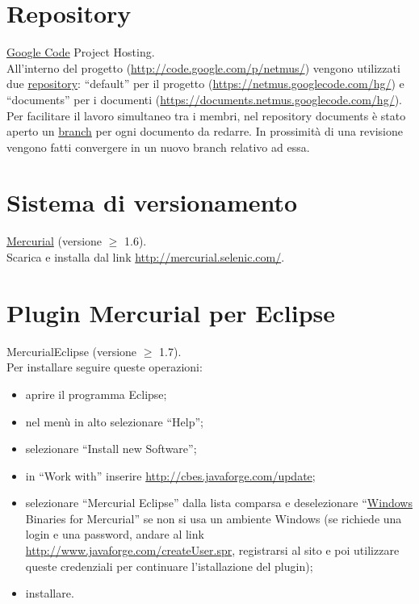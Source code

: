 \section{Repository}
\underline{Google Code} Project Hosting.
\\
All'interno del progetto (\url{http://code.google.com/p/netmus/}) vengono
utilizzati due \underline{repository}: ``default'' per il progetto
(\url{https://netmus.googlecode.com/hg/}) e ``documents'' per i documenti
(\url{https://documents.netmus.googlecode.com/hg/}).\\
Per facilitare il lavoro simultaneo tra i membri, nel repository documents \`e
stato aperto un \underline{branch} per ogni documento da redarre. In prossimit\`a di una
revisione vengono fatti convergere in un nuovo branch relativo ad essa.

\section{Sistema di versionamento}
\underline{Mercurial}  (versione $\geq$ 1.6). 
\\
Scarica e installa dal link
\url{http://mercurial.selenic.com/}.

\section{Plugin Mercurial per Eclipse}
MercurialEclipse (versione $\geq$ 1.7). 
\\
Per installare seguire queste
operazioni: 
\begin{itemize}
\item {aprire il programma Eclipse;} 
\item {nel men\`u in alto selezionare ``Help'';}
\item {selezionare ``Install new Software'';}
\item {in ``Work with'' inserire \url{http://cbes.javaforge.com/update};}
\item {selezionare ``Mercurial Eclipse'' dalla lista comparsa e deselezionare
``\underline{Windows} Binaries for Mercurial'' se non si usa un ambiente Windows
(se richiede una login e una password, andare al link
\url{http://www.javaforge.com/createUser.spr}, registrarsi al sito e poi
utilizzare queste credenziali per continuare l'istallazione del plugin);}
\item {installare.}
\end{itemize}

